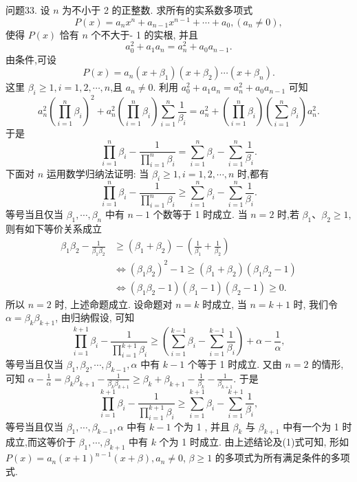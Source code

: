 问题33. 设 $n$ 为不小于 2 的正整数.
求所有的实系数多项式
$$
P(x)=a_n x^n+a_{n-1} x^{n-1}+\cdots+a_0,\left(a_n \neq 0\right),
$$
使得 $P(x)$ 恰有 $n$ 个不大于- 1 的实根, 并且
$$
a_0^2+a_1 a_n=a_n^2+a_0 a_{n-1} .
$$
由条件,可设
$$
P(x)=a_n\left(x+\beta_1\right)\left(x+\beta_2\right) \cdots\left(x+\beta_n\right) .
$$
这里 $\beta_i \geqslant 1, i=1,2, \cdots, n$,且 $a_n \neq 0$.
利用 $a_0^2+a_1 a_n=a_n^2+a_0 a_{n-1}$ 可知
$$
a_n^2\left(\prod_{i=1}^n \beta_i\right)^2+a_n^2\left(\prod_{i=1}^n \beta_i\right) \sum_{i=1}^n \frac{1}{\beta_i}=a_n^2+\left(\prod_{i=1}^n \beta_i\right)\left(\sum_{i=1}^n \beta_i\right) a_n^2 .
$$
于是
$$
\prod_{i=1}^n \beta_i-\frac{1}{\prod_{i=1}^n \beta_i}=\sum_{i=1}^n \beta_i-\sum_{i=1}^n \frac{1}{\beta_i} . \label{(1)}
$$
下面对 $n$ 运用数学归纳法证明: 当 $\beta_i \geqslant 1, i=1,2, \cdots, n$ 时,都有
$$
\prod_{i=1}^n \beta_i-\frac{1}{\prod_{i=1}^n \beta_i} \geqslant \sum_{i=1}^n \beta_i-\sum_{i=1}^n \frac{1}{\beta_i} .
$$
等号当且仅当 $\beta_1, \cdots, \beta_n$ 中有 $n-1$ 个数等于 1 时成立.
当 $n=2$ 时,若 $\beta_1 、 \beta_2 \geqslant 1$, 则有如下等价关系成立
$$
\begin{aligned}
\beta_1 \beta_2-\frac{1}{\beta_1 \beta_2} & \geqslant\left(\beta_1+\beta_2\right)-\left(\frac{1}{\beta_1}+\frac{1}{\beta_2}\right) \\
& \Leftrightarrow\left(\beta_1 \beta_2\right)^2-1 \geqslant\left(\beta_1+\beta_2\right)\left(\beta_1 \beta_2-1\right) \\
& \Leftrightarrow\left(\beta_1 \beta_2-1\right)\left(\beta_1-1\right)\left(\beta_2-1\right) \geqslant 0 .
\end{aligned}
$$
所以 $n=2$ 时, 上述命题成立.
设命题对 $n=k$ 时成立, 当 $n=k+1$ 时, 我们令 $\alpha=\beta_k \beta_{k+1}$, 由归纳假设, 可知
$$
\prod_{i=1}^{k+1} \beta_i-\frac{1}{\prod_{i=1}^{k+1} \beta_i} \geqslant\left(\sum_{i=1}^{k-1} \beta_i-\sum_{i=1}^{k-1} \frac{1}{\beta_i}\right)+\alpha-\frac{1}{\alpha},
$$
等号当且仅当 $\beta_1, \beta_2, \cdots, \beta_{k-1}, \alpha$ 中有 $k-1$ 个等于 1 时成立.
又由 $n=2$ 的情形, 可知 $\alpha-\frac{1}{\alpha}=\beta_k \beta_{k+1}-\frac{1}{\beta_k \beta_{k+1}} \geqslant \beta_k+\beta_{k+1}-\frac{1}{\beta_k}-\frac{1}{\beta_{k+1}}$. 于是
$$
\prod_{i=1}^{k+1} \beta_i-\frac{1}{\prod_{i=1}^{k+1} \beta_i} \geqslant \sum_{i=1}^{k+1} \beta_i-\sum_{i=1}^{k+1} \frac{1}{\beta_i},
$$
等号当且仅当 $\beta_1, \cdots, \beta_{k-1}, \alpha$ 中有 $k-1$ 个为 1 , 并且 $\beta_k$ 与 $\beta_{k+1}$ 中有一个为 1 时成立,而这等价于 $\beta_1, \cdots, \beta_{k+1}$ 中有 $k$ 个为 1 时成立.
由上述结论及(1)式可知, 形如 $P(x)=a_n(x+1)^{n-1}(x+\beta), a_n \neq 0$, $\beta \geqslant 1$ 的多项式为所有满足条件的多项式.



